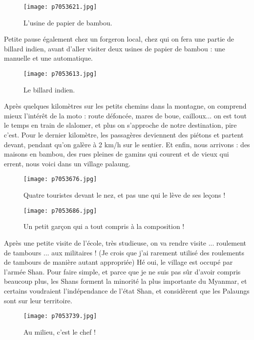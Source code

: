 \documentclass{book}
\begin{document}
\begin{figure}[h]
\centering
\texttt{[image: p7053621.jpg]}
\caption*{L'usine de papier de bambou.}
\end{figure}

Petite pause également chez un forgeron local, chez qui on fera une partie de billard indien, avant d'aller visiter deux usines de papier de bambou : une manuelle et une automatique.


\begin{figure}[h]
\centering
\texttt{[image: p7053613.jpg]}
\caption*{Le billard indien.}
\end{figure}

Après quelques kilomètres sur les petits chemins dans la montagne, on comprend mieux l'intérêt de la moto : route défoncée, mares de boue, cailloux... on est tout le temps en train de slalomer, et plus on s'approche de notre destination, pire c'est. Pour le dernier kilomètre, les passagères deviennent des piétons et partent devant, pendant qu'on galère à 2 km/h sur le sentier. Et enfin, nous arrivons : des maisons en bambou, des rues pleines de gamins qui courent et de vieux qui errent, nous voici dans un village palaung.


\begin{figure}[h]
\centering
\texttt{[image: p7053676.jpg]}
\caption*{Quatre touristes devant le nez, et pas une qui le lève de ses leçons !}
\end{figure}


\begin{figure}[h]
\centering
\texttt{[image: p7053686.jpg]}
\caption*{Un petit garçon qui a tout compris à la composition !}
\end{figure}

Après une petite visite de l'école, très studieuse, on va rendre visite ... roulement de tambours ... aux militaires ! (Je crois que j'ai rarement utilisé des roulements de tambours de manière autant appropriée) Hé oui, le village est occupé par l'armée Shan. Pour faire simple, et parce que je ne suis pas sûr d'avoir compris beaucoup plus, les Shans forment la minorité la plus importante du Myanmar, et certains voudraient l'indépendance de l'état Shan, et considèrent que les Palaungs sont sur leur territoire.


\begin{figure}[h]
\centering
\texttt{[image: p7053739.jpg]}
\caption*{Au milieu, c'est le chef !}
\end{figure}
\end{document}
